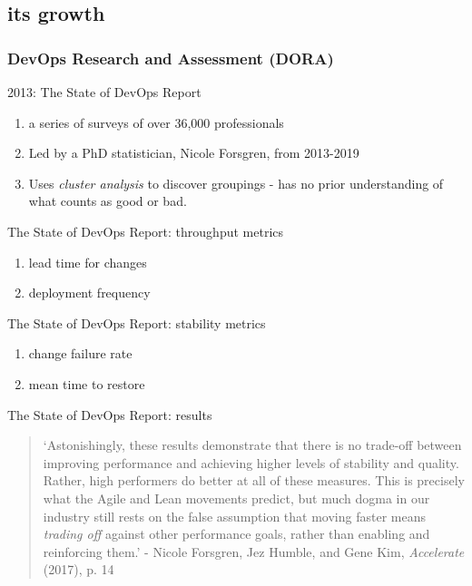 \documentclass{beamer}
\begin{document}
	\subsection{its growth}
	\subsubsection{DevOps Research and Assessment (DORA)}
	\begin{frame}{2013: The State of DevOps Report}
		\begin{enumerate}
			\item a series of surveys of over 36,000 professionals \pause
			\item Led by a PhD statistician, Nicole Forsgren, from 2013-2019 \pause
			\item Uses \emph{cluster analysis} to discover groupings - has no prior understanding of what counts as good or bad.
		\end{enumerate}
	\end{frame}
	\begin{frame}{The State of DevOps Report: throughput metrics}
		\begin{enumerate}
			\item lead time for changes \pause
			\item deployment frequency 
		\end{enumerate}
	\end{frame}
	\begin{frame}{The State of DevOps Report: stability metrics}
		\begin{enumerate}
			\item change failure rate \pause
			\item mean time to restore
		\end{enumerate}
	\end{frame}
	\begin{frame}{The State of DevOps Report: results}
		\begin{quote}
			`Astonishingly, these results demonstrate that there is no trade-off between improving performance and achieving higher levels of stability and quality. Rather, high performers do better at all of these measures. This is precisely what the Agile and Lean movements predict, but much dogma in our industry still rests on the false assumption that moving faster means \emph{trading off} against other performance goals, rather than enabling and reinforcing them.'  - Nicole Forsgren, Jez Humble, and Gene Kim, \emph{Accelerate} (2017), p. 14
		\end{quote}
	\end{frame}
\end{document}
